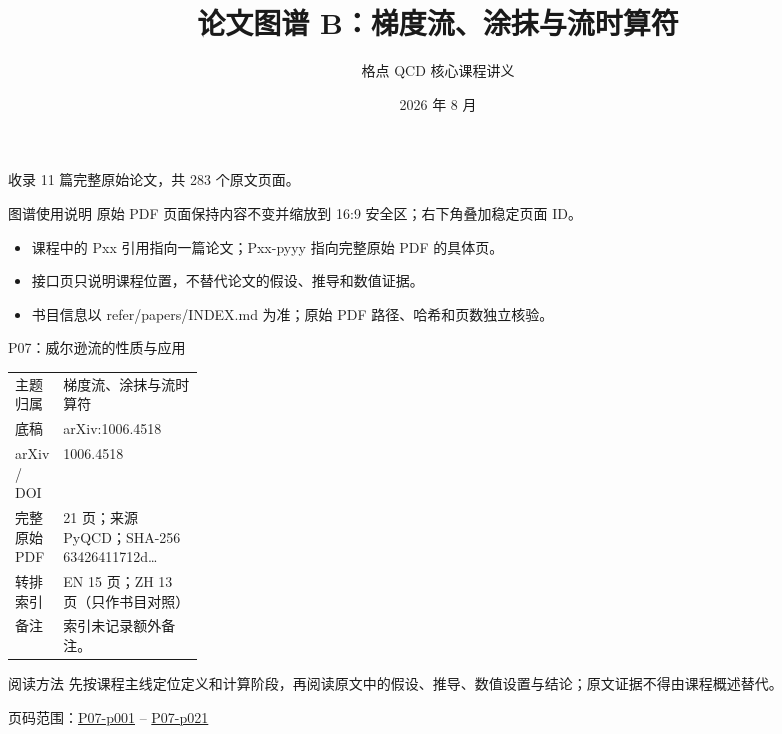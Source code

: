 \documentclass[aspectratio=169,10pt]{ctexbeamer}
\title{论文图谱 B：梯度流、涂抹与流时算符}
\author{格点 QCD 核心课程讲义}
\date{2026 年 8 月}
\begin{document}
\begin{frame}[plain]\titlepage
\vfill\centering 收录 11 篇完整原始论文，共 283 个原文页面。
\end{frame}
\begin{frame}[t]{图谱使用说明}
\small 原始 PDF 页面保持内容不变并缩放到 16:9 安全区；右下角叠加稳定页面 ID。
\begin{itemize}
\item 课程中的 Pxx 引用指向一篇论文；Pxx-pyyy 指向完整原始 PDF 的具体页。
\item 接口页只说明课程位置，不替代论文的假设、推导和数值证据。
\item 书目信息以 refer/papers/INDEX.md 为准；原始 PDF 路径、哈希和页数独立核验。
\end{itemize}\end{frame}
\begin{frame}[t]{P07：威尔逊流的性质与应用}
\small\begin{tabularx}{\linewidth}{p{0.22\linewidth}Y}
\toprule 主题归属 & 梯度流、涂抹与流时算符\\
底稿 & arXiv:1006.4518\\
arXiv / DOI & 1006.4518\\
完整原始 PDF & 21 页；来源 PyQCD；SHA-256 63426411712d\ldots\\
转排索引 & EN 15 页；ZH 13 页（只作书目对照）\\
备注 & 索引未记录额外备注。\\
\bottomrule\end{tabularx}\vspace{0.25cm}
\begin{block}{阅读方法}
先按课程主线定位定义和计算阶段，再阅读原文中的假设、推导、数值设置与结论；原文证据不得由课程概述替代。
\end{block}
\vfill 页码范围：\hyperlink{P07-p001}{P07-p001} -- \hyperlink{P07-p021}{P07-p021}
\end{frame}
\end{document}
